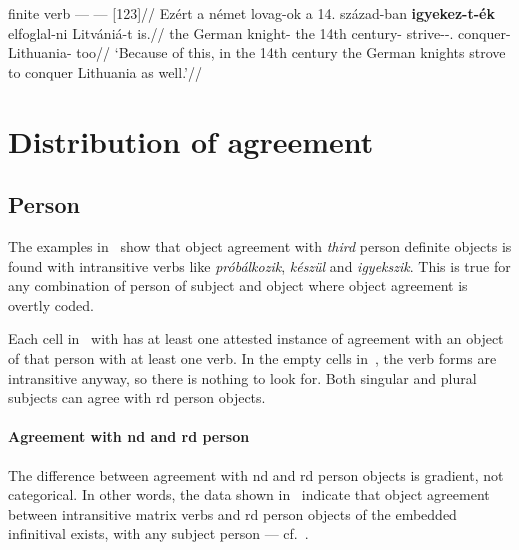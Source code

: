 \ex\label{ex:lovag-igyek}
    \begingl
        \glpreamble finite verb --- \Inf{} --- \Obj{} [123]//
        \gla 	Ezért a német lovag-ok a 14. század-ban \textbf{igyekez-t-ék} elfoglal-ni Litvániá-t is.//
         the German knight-\Pl{} the 14th century-\Ine{} strive-\Pst-\Tpl.\Obj{} conquer-\Inf{} Lithuania-\Acc{} too//
        \glft 	\enquote*{Because of this, in the 14th century the German knights strove to conquer Lithuania as well.}\trailingcitation{}//
    \endgl
\xe

\section{Distribution of agreement}\label{sec:distribution-of-agreement}

\subsection{Person}

The examples in~ show that object agreement with \emph{third}
person definite objects is found with intransitive verbs like
\emph{próbálkozik}, \emph{készül} and \emph{igyekszik}. This is true for any
combination of person of subject and object where object agreement is overtly
coded.

Each cell in~ with  has at least one attested
instance of agreement with an object of that person with at least one verb.  In
the empty cells in~, the verb forms are intransitive anyway,
so there is nothing to look for. Both singular and plural subjects can agree
with \Third{}rd person objects.

\paragraph{Agreement with \Second{}nd and \Third{}rd person}

The difference between agreement with \Second{}nd and \Third{}rd person objects
is gradient, not categorical. In other words, the data shown in~
indicate that object agreement between intransitive matrix verbs and \Third{}rd
person objects of the embedded infinitival exists, with any subject person ---
cf.~.

